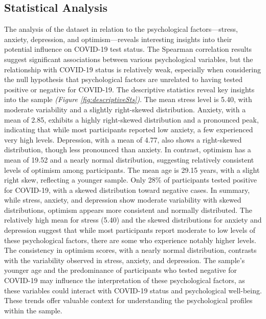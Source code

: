 \documentclass[a4paper]{article}
\begin{document}
\subsection{Statistical Analysis}
\vspace{0.5em}
The analysis of the dataset in relation to the psychological factors—stress, anxiety, depression, and optimism—reveals interesting insights into their potential influence on COVID-19 test status.
The Spearman correlation results suggest significant associations between various psychological variables, but the relationship with COVID-19 status is relatively weak,
especially when considering the null hypothesis that psychological factors are unrelated to having tested positive or negative for COVID-19.
\vspace{0.5em}\newline
The descriptive statistics reveal key insights into the sample \textit{(Figure \ref{fig:descriptiveSts})}. 
The mean stress level is 5.40, with moderate variability and a slightly right-skewed distribution. Anxiety, with a mean of 2.85, exhibits a highly right-skewed distribution and a pronounced peak,
indicating that while most participants reported low anxiety, a few experienced very high levels.
Depression, with a mean of 4.77, also shows a right-skewed distribution, though less pronounced than anxiety.
In contrast, optimism has a mean of 19.52 and a nearly normal distribution, suggesting relatively consistent levels of optimism among participants.\newline
The mean age is 29.15 years, with a slight right skew, reflecting a younger sample.
Only 28\% of participants tested positive for COVID-19, with a skewed distribution toward negative cases.\newline
In summary, while stress, anxiety, and depression show moderate variability with skewed distributions, optimism appears more consistent and normally distributed.\newline 
The relatively high mean for stress (5.40) and the skewed distributions for anxiety and depression suggest that while most participants report moderate
to low levels of these psychological factors, there are some who experience notably higher levels.
The consistency in optimism scores, with a nearly normal distribution, contrasts with the variability observed in stress, anxiety, and depression.\newline
The sample's younger age and the predominance of participants who tested negative for COVID-19 may influence the interpretation of these psychological factors,
as these variables could interact with COVID-19 status and psychological well-being.\newline
These trends offer valuable context for understanding the psychological profiles within the sample.
\vspace{1.5em}
\end{document}
